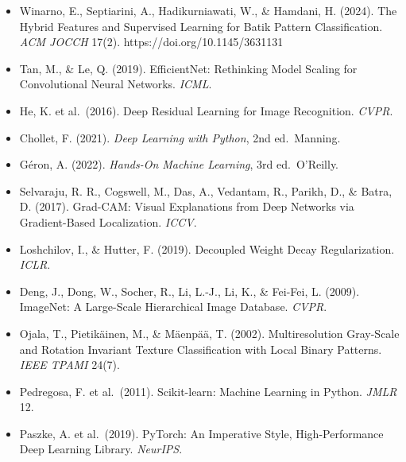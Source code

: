 \documentclass[10pt,a4paper]{article}
\providecommand{\tightlist}{\setlength{\itemsep}{2pt}\setlength{\parskip}{0pt}}
\begin{document}
\begin{itemize}
\tightlist
\item
  Winarno, E., Septiarini, A., Hadikurniawati, W., \& Hamdani, H. (2024). The Hybrid Features and Supervised Learning for Batik Pattern Classification. \emph{ACM JOCCH} 17(2). https://doi.org/10.1145/3631131
\item
  Tan, M., \& Le, Q. (2019). EfficientNet: Rethinking Model Scaling for Convolutional Neural Networks. \emph{ICML}.
\item
  He, K. et al.~(2016). Deep Residual Learning for Image Recognition. \emph{CVPR}.
\item
  Chollet, F. (2021). \emph{Deep Learning with Python}, 2nd ed.~Manning.
\item
  Géron, A. (2022). \emph{Hands-On Machine Learning}, 3rd ed.~O'Reilly.
\item
  Selvaraju, R. R., Cogswell, M., Das, A., Vedantam, R., Parikh, D., \& Batra, D. (2017). Grad-CAM: Visual Explanations from Deep Networks via Gradient-Based Localization. \emph{ICCV}.
\item
  Loshchilov, I., \& Hutter, F. (2019). Decoupled Weight Decay Regularization. \emph{ICLR}.
\item
  Deng, J., Dong, W., Socher, R., Li, L.-J., Li, K., \& Fei-Fei, L. (2009). ImageNet: A Large-Scale Hierarchical Image Database. \emph{CVPR}.
\item
  Ojala, T., Pietikäinen, M., \& Mäenpää, T. (2002). Multiresolution Gray-Scale and Rotation Invariant Texture Classification with Local Binary Patterns. \emph{IEEE TPAMI} 24(7).
\item
  Pedregosa, F. et al.~(2011). Scikit-learn: Machine Learning in Python. \emph{JMLR} 12.
\item
  Paszke, A. et al.~(2019). PyTorch: An Imperative Style, High-Performance Deep Learning Library. \emph{NeurIPS}.
\end{itemize}
\end{document}
